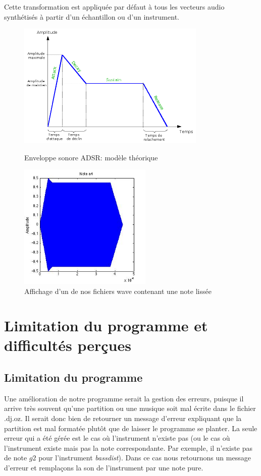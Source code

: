 \documentclass[10pt,a4paper]{article}
\begin{document}
Cette transformation est appliquée par défaut à tous les vecteurs audio synthétisés à partir d'un échantillon ou d'un instrument.

\begin{figure}[h!]
    \begin{minipage}[b]{0.4\linewidth}
        \centering \includegraphics[height=6cm]{images/ADSR.png}
        \caption{Enveloppe sonore ADSR: modèle théorique}
    \end{minipage}\hfill
    \begin{minipage}[b]{0.48\linewidth}
        \centering \includegraphics[height=6cm]{images/OurADSR.jpg}
        \caption{Affichage d'un de nos fichiers wave contenant une note lissée}
    \end{minipage}
\end{figure}

\section{Limitation du programme et difficultés perçues}
\subsection{Limitation du programme}
Une amélioration de notre programme serait la gestion des erreurs, 
puisque il arrive très souvent qu'une partition ou une musique soit mal écrite dans le fichier .dj.oz.
Il serait donc bien de retourner un message d'erreur expliquant que la partition est mal formatée 
plutôt que de laisser le programme se planter.
La seule erreur qui a été gérée est le cas où l'instrument n'existe pas (ou le cas où l'instrument
existe mais pas la note correspondante. Par exemple, il n'existe pas de note $g2$ pour 
l'instrument \textit{bassdist}). Dans ce cas nous retournons un message
d'erreur et remplaçons la son de l'instrument par une note pure.
\end{document}
